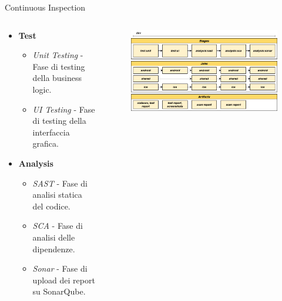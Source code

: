     \begin{frame}{Continuous Inspection}
        \begin{columns}[onlytextwidth]
            \begin{column}{0.4\textwidth}
                \begin{itemize}
                    \item \textbf{Test}
                        \begin{itemize}
                            \item \textit{Unit Testing} - Fase di testing della business logic.
                            \item \textit{UI Testing} - Fase di testing della interfaccia grafica.
                        \end{itemize}
                    \item \textbf{Analysis}
                        \begin{itemize}
                            \item \textit{SAST} - Fase di analisi statica del codice.
                            \item \textit{SCA} - Fase di analisi delle dipendenze.
                            \item \textit{Sonar} - Fase di upload dei report su SonarQube.
                        \end{itemize}
                \end{itemize}
            \end{column}
            \begin{column}{0.6\textwidth}
                \begin{figure}[H]
                    \centering
                    \includegraphics[width=1\textwidth]{img/tesi-2-Page-19.drawio.png}
                \end{figure}
            \end{column}
            
        \end{columns}
    \end{frame}